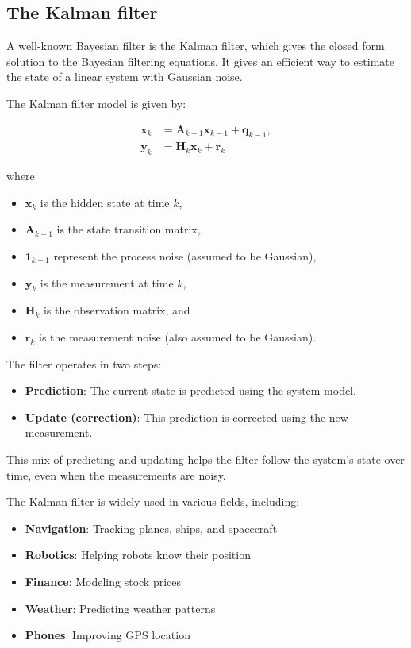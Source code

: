 \subsection{The Kalman filter}
A well-known Bayesian filter is the Kalman filter, which gives the closed form solution to the Bayesian filtering equations. It gives an efficient way to estimate the state of a linear system with Gaussian noise.

The Kalman filter model is given by:

\begin{align}\label{eq:Kalman filter}
    \mathbf{x}_k &= \mathbf{A}_{k-1}\mathbf{x}_{k-1}+\mathbf{q}_{k-1}, \nonumber\\
    \mathbf{y}_k &= \mathbf{H}_k\mathbf{x}_k+\mathbf{r}_k
\end{align}

where 
\begin{itemize}
    \item $\mathbf{x}_k$ is the hidden state at time $k$,
    \item $\mathbf{A}_{k-1}$ is the state transition matrix,
    \item $\mathbf{1}_{k-1}$ represent the process noise (assumed to be Gaussian),
    \item $\mathbf{y}_k$ is the measurement at time $k$,
    \item $\mathbf{H}_k$ is the observation matrix, and
    \item $\mathbf{r}_k$ is the measurement noise (also assumed to be Gaussian).
\end{itemize}

The filter operates in two steps:
\begin{itemize}
    \item \textbf{Prediction}: The current state is predicted using the system model.
    \item \textbf{Update (correction)}: This prediction is corrected using the new measurement.
\end{itemize}

This mix of predicting and updating helps the filter follow the system’s state over time, even when the measurements are noisy.

The Kalman filter is widely used in various fields, including:
\begin{itemize}
    \item \textbf{Navigation}: Tracking planes, ships, and spacecraft
    \item \textbf{Robotics}: Helping robots know their position
    \item \textbf{Finance}: Modeling stock prices
    \item \textbf{Weather}: Predicting weather patterns
    \item \textbf{Phones}: Improving GPS location
\end{itemize}


